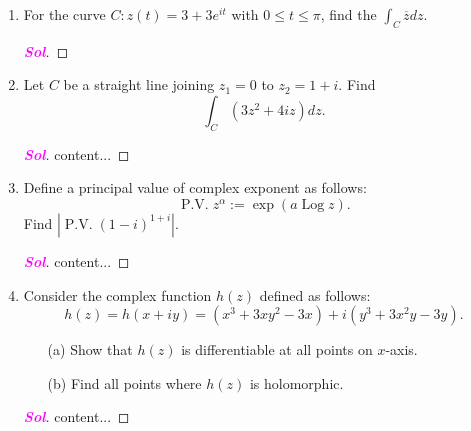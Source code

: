 \documentclass{article}
\theoremstyle{definition}
\newcommand{\C}{\mathbb{C}}
\newcommand{\Log}{\operatorname{Log}}
\newcommand{\pv}{\operatorname{P.V.}}
\newcommand{\of}[1]{\left( #1 \right)}
\newcommand{\abs}[1]{\left\lvert #1 \right\rvert}
\newcommand{\sol}{\textcolor{magenta}{\bf Sol}}
\newcommand{\conjugate}[1]{\overline{#1}}
\begin{document}
\begin{enumerate}
\begin{proof}[\sol]
\begin{enumerate}
				\vspace{4pt}
				\item[(c)] Let $\begin{cases}
				u(x,y)=e^x\cos y,\\
				v(x,y)=e^x\sin y
				\end{cases}$ then \[
				u_x=e^x\cos y,\quad u_y=-e^x\sin y,\quad v_x=e^x\sin y,\quad\text{and}\quad v_y=e^x\cos y.
				\] Since $u_x=v_y$ and $u_y=-v_x$, a function $f$ satisfies CR-Eqs. Thus $f$ is differentiable on $\C$ and holomorphic in $\C$. And \[
				f'\of{z}=u_x+iv_x=e^x\cos y+ie^x\sin y=e^{x+iy}=e^z.
				\]
				\vspace{4pt}
				\item[(d)]
			\end{enumerate}
		\end{proof}
		\vspace{8pt}
		\item For the curve $C:z(t) = 3 + 3e^{it}$ with $0\leq t\leq\pi$, find the $\displaystyle\int_C\conjugate{z}dz$.
		\begin{proof}[\sol]
		\end{proof}
		\vspace{8pt}
		\item Let $C$ be a straight line joining $z_1=0$ to $z_2=1+i$. Find \[
		\int_C\of{3z^2+4iz}dz.
		\]
		\begin{proof}[\sol]
			content...
		\end{proof}
		\vspace{8pt}
		\item Define a principal value of complex exponent as follows: \[
		\pv z^\alpha:=\exp\of{a\Log z}.
		\] Find $\abs{\pv\of{1-i}^{1+i}}$.
		\begin{proof}[\sol]
			content...
		\end{proof}
		\vspace{8pt}
		\item Consider the complex function $h\of{z}$ defined as follows: \[
		h\of{z}=h\of{x+iy}=\of{x^3+3xy^2-3x}+i\of{y^3+3x^2y-3y}.
		\]\begin{itemize}
			\item[(a)] Show that $h\of{z}$ is differentiable at all points on $x$-axis.
			\item[(b)] Find all points where $h\of{z}$ is holomorphic.
		\end{itemize}
		\begin{proof}[\sol]
			content...
		\end{proof}
		\vspace{8pt}

\end{enumerate}
\end{document}
